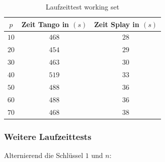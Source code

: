 \documentclass[a4paper,12pt]{article}
\begin{document}
\begin{table}[H]
	\begin{center}
		\begin{tabular}[c]{|c|c|c|}
			\hline
			$p$ & Zeit Tango in $\left(s\right)$ &Zeit Splay in $\left(s\right)$ \\
			\hline
			$10$ & $468$ &$28$ \\
			\hline
			$20$  & $454$ &$29$  \\
			\hline
			$30$  & $463$ &$30$  \\
			\hline
			$40$  & $519$ &$33$  \\
			\hline
			$50$  & $488$ &$36$  \\
			\hline
		    $60$  & $488$ &$36$  \\
			\hline
			$70$  & $468$ &$38$  \\
			\hline
		\end{tabular}
		\caption{Laufzeittest working set} 
	\end{center}
\end{table}
\newpage
\subsubsection{Weitere Laufzeittests}

\noindent Alternierend die Schlüssel $1$ und $n$:
\end{document}
